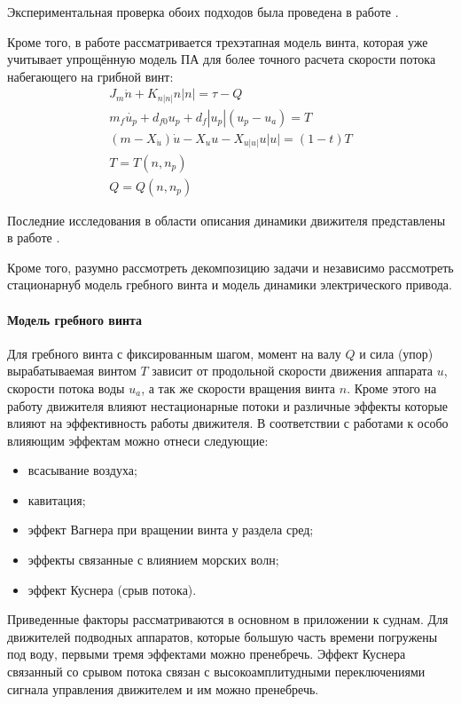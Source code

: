 Экспериментальная проверка обоих подходов была проведена в работе \cite{whitcomb1999development}.

Кроме того, в работе \cite{blanke2000dynamic} рассматривается трехэтапная модель винта, которая уже учитывает упрощённую модель ПА для более точного расчета скорости потока набегающего на грибной винт:
\begin{gather}
    J_m\dot{n} + K_{n|n|}n|n| = \tau - Q \\
    m_f \dot{u_p} + d_{f0}u_p + d_f|u_p|(u_p - u_a) = T \\
    (m - X_{\dot{u}})\dot{u} - X_u u - X_{u|u|}u|u| = (1-t)T\\
    T = T(n,n_p) \\
    Q = Q(n,n_p)
\end{gather}

Последние исследования в области описания динамики движителя представлены в работе \cite{10.1109/robot.2005.1570115}.

Кроме того, разумно рассмотреть декомпозицию задачи и независимо рассмотреть стационарнуб модель гребного винта и модель динамики электрического привода.

\paragraph{Модель гребного винта}

Для гребного винта с фиксированным шагом, момент на валу $Q$ и сила (упор) вырабатываемая винтом $T$ зависит от продольной скорости движения аппарата $u$, скорости потока воды $u_a$, а так же скорости вращения винта $n$.
Кроме этого на работу движителя влияют нестационарные потоки и различные эффекты которые влияют на эффективность работы движителя.
В соответствии с работами \cite{newman2018marine, breslin1996hydrodynamics, carlton2018marine} к особо влияющим эффектам можно отнеси следующие:
\begin{itemize}
    \item всасывание воздуха;
    \item кавитация;
    \item эффект Вагнера при вращении винта у раздела сред;
    \item эффекты связанные с влиянием морских волн;
    \item эффект Куснера (срыв потока).
\end{itemize}

Приведенные факторы рассматриваются в основном в приложении к суднам.
Для движителей подводных аппаратов, которые большую часть времени погружены под воду, первыми тремя эффектами можно пренебречь.
Эффект Куснера связанный со срывом потока связан с высокоамплитудными переключениями сигнала управления движителем и им можно пренебречь.

